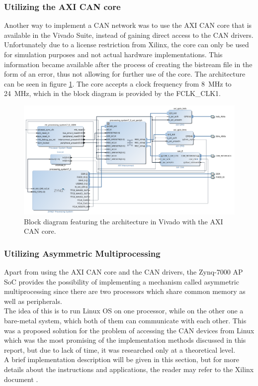 \subsubsection{Utilizing the AXI CAN core}

Another way to implement a CAN network was to use the AXI CAN core that is available in the Vivado Suite, instead of gaining direct access to the CAN drivers.
Unfortunately due to a license restriction from Xilinx, the core can only be used for simulation purposes and not actual hardware implementations.
This information became available after the process of creating the bistream file in the form of an error, thus not allowing for further use of the core.
The architecture can be seen in figure \ref{fig:CAN_Arch_with_AXI_CAN}.
The core accepts a clock frequency from \SI{8}{\mega\hertz} to \SI{24}{\mega\hertz}, which in the block diagram is provided by the FCLK\_CLK1.

\begin{figure}[h!]
	\centering
	\includegraphics[width = 1.2\linewidth]{graphics/Zybo_Arch_with_AXI_CAN.png}
	\caption{Block diagram featuring the architecture in Vivado with the AXI CAN core.}
	\label{fig:CAN_Arch_with_AXI_CAN}
\end{figure}

\subsubsection{Utilizing Asymmetric Multiprocessing}

Apart from using the AXI CAN core and the CAN drivers, the Zynq-7000 AP SoC provides the possibility of implementing a mechanism called asymmetric multiprocessing since there are two processors which share common memory as well as peripherals.
\\
The idea of this is to run Linux OS on one processor, while on the other one a bare-metal system, which both of them can communicate with each other.
This was a proposed solution for the problem of accessing the CAN devices from Linux which was the most promising of the implementation methods discussed in this report, but due to lack of time, it was researched only at a theoretical level.
\\
A brief implementation description will be given in this section, but for more details about the instructions and applications, the reader may refer to the Xilinx document \cite{Xilinx_AMP}.

